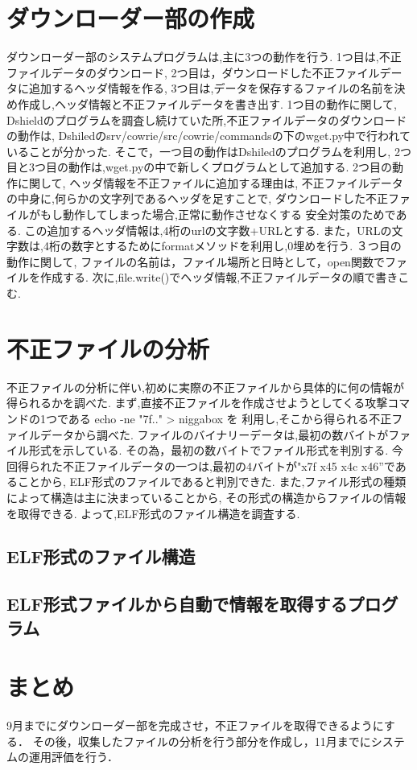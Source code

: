 \documentclass{entry}
\begin{document}
\section{ダウンローダー部の作成}
ダウンローダー部のシステムプログラムは,主に3つの動作を行う.
1つ目は,不正ファイルデータのダウンロード,
2つ目は，ダウンロードした不正ファイルデータに追加するヘッダ情報を作る,
3つ目は,データを保存するファイルの名前を決め作成し,ヘッダ情報と不正ファイルデータを書き出す.
1つ目の動作に関して,
Dshieldのプログラムを調査し続けていた所,不正ファイルデータのダウンロードの動作は,
Dshiledのsrv/cowrie/src/cowrie/commandsの下のwget.py中で行われていることが分かった.
そこで，一つ目の動作はDshiledのプログラムを利用し,
2つ目と3つ目の動作は,wget.pyの中で新しくプログラムとして追加する.
2つ目の動作に関して,
ヘッダ情報を不正ファイルに追加する理由は,
不正ファイルデータの中身に,何らかの文字列であるヘッダを足すことで,
ダウンロードした不正ファイルがもし動作してしまった場合,正常に動作させなくする
安全対策のためである.
この追加するヘッダ情報は,4桁のurlの文字数+URLとする.
また，URLの文字数は,4桁の数字とするためにformatメソッドを利用し,0埋めを行う.
３つ目の動作に関して,
ファイルの名前は，ファイル場所と日時として，open関数でファイルを作成する.
次に,file.write()でヘッダ情報,不正ファイルデータの順で書きこむ.


\section{不正ファイルの分析}
不正ファイルの分析に伴い,初めに実際の不正ファイルから具体的に何の情報が得られるかを調べた.
まず,直接不正ファイルを作成させようとしてくる攻撃コマンドの1つである echo -ne "\x7f.." > niggabox を
利用し,そこから得られる不正ファイルデータから調べた.
ファイルのバイナリーデータは,最初の数バイトがファイル形式を示している.
その為，最初の数バイトでファイル形式を判別する.
今回得られた不正ファイルデータの一つは,最初の4バイトが"x7f x45 x4c x46”であることから,
ELF形式のファイルであると判別できた.
また,ファイル形式の種類によって構造は主に決まっていることから,
その形式の構造からファイルの情報を取得できる.
よって,ELF形式のファイル構造を調査する.
\subsection{ELF形式のファイル構造}
\subsection{ELF形式ファイルから自動で情報を取得するプログラム}

\section{まとめ}

9月までにダウンローダー部を完成させ，不正ファイルを取得できるようにする．
その後，収集したファイルの分析を行う部分を作成し，11月までにシステムの運用評価を行う．



%

\end{document}
